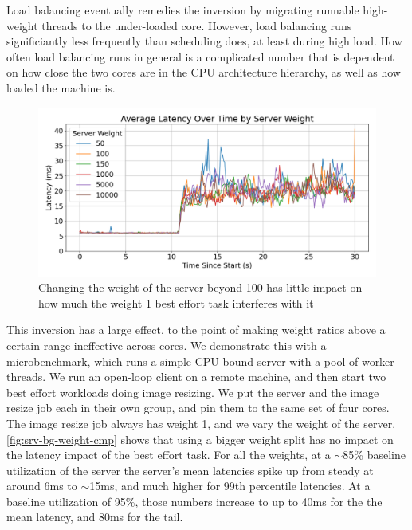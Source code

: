 Load balancing eventually remedies the inversion by migrating runnable
high-weight threads to the under-loaded core. However, load balancing runs
significiantly less frequently than scheduling does, at least during high load.
How often load balancing runs in general is a complicated number that is
dependent on how close the two cores are in the CPU architecture hierarchy, as
well as how loaded the machine is.

\begin{figure}[t]
    \centering
    \includegraphics[width=\columnwidth]{graphs/srv-bg-weight-cmp-low.png}
    \caption{Changing the weight of the server beyond 100 has little impact on
    how much the weight 1 best effort task interferes with
    it}\label{fig:srv-bg-weight-cmp}
\end{figure}

This inversion
has a large effect, to the point of making weight ratios above a certain range
ineffective across cores. We demonstrate this with a microbenchmark, which runs
a simple CPU-bound server with a pool of worker threads. We run an open-loop
client on a remote machine, and then start two best effort workloads doing image
resizing. We put the server and the image resize job each in their own
\cgroups{} group, and pin them to the same set of four cores. The image resize
job always has weight 1, and we vary the weight of the server.
\autoref{fig:srv-bg-weight-cmp} shows that using a bigger weight split has no
impact on the latency impact of the best effort task. For all the weights, at a
$\sim$85\% baseline utilization of the server the server's mean latencies spike
up from steady at around 6ms to $\sim$15ms, and much higher for 99th percentile
latencies. At a baseline utilization of 95\%, those numbers increase to up to
40ms for the the mean latency, and 80ms for the tail.



